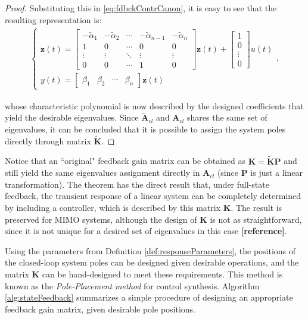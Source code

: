 \documentclass[a4paper,11pt]{book}
\numberwithin{figure}{chapter}
\numberwithin{equation}{chapter}
\numberwithin{table}{chapter}
\theoremstyle{definition}
\begin{document}
\begin{proof}
    \noindent Substituting this in \eqref{eq:fdbckContrCanon}, it is easy to see that the resulting representation is:
    \begin{align} \label{eq:SSFdbckControlCanon}
    \begin{cases}
        \dot{\bm{z}}(t) = \begin{bmatrix}
            -\tilde{\alpha}_1 & -\tilde{\alpha}_2 & \cdots & -\tilde{\alpha}_{n-1} & -\tilde{\alpha}_n \\
            1 & 0 & \cdots & 0 & 0 \\
            \vdots & \vdots & \ddots & \vdots & \vdots \\
            0 & 0 & \cdots & 1 & 0 
        \end{bmatrix} \bm{z}(t) + \begin{bmatrix}
            1 \\ 0 \\ \vdots \\ 0
        \end{bmatrix} u(t) \\
        y(t) = \begin{bmatrix} \beta_1 & \beta_2 & \cdots & \beta_n \end{bmatrix} \bm{z}(t)
    \end{cases}
    ,\end{align} 
    
    \noindent whose characteristic polynomial is now described by the designed coefficients that yield the desirable eigenvalues. Since $\tilde{\bm{A}}_{cl}$ and $\bm{A}_{cl}$ shares the same set of eigenvalues, it can be concluded that it is possible to assign the system poles directly through matrix $\tilde{\bm{K}}$.
\end{proof}

Notice that an ``original" feedback gain matrix can be obtained as $\bm{K} = \tilde{\bm{K}} \bm{P}$ and still yield the same eigenvalues assignment directly in $\bm{A}_{cl}$ (since $\bm{P}$ is just a linear transformation). The theorem has the direct result that, under full-state feedback, the transient response of a linear system can be completely determined by including a controller, which is described by this matrix $\bm{K}$. The result is preserved for MIMO systems, although the design of $\bm{K}$ is not as straightforward, since it is not unique for a desired set of eigenvalues in this case \textbf{[reference]}. 

Using the parameters from Definition \ref{def:responseParameters}, the positions of the closed-loop system poles can be designed given desirable operations, and the matrix $\bm{K}$ can be hand-designed to meet these requirements. This method is known as the \textit{Pole-Placement method} for control synthesis. Algorithm \ref{alg:stateFeedback} summarizes a simple procedure of designing an appropriate feedback gain matrix, given desirable pole positions.
\end{document}
